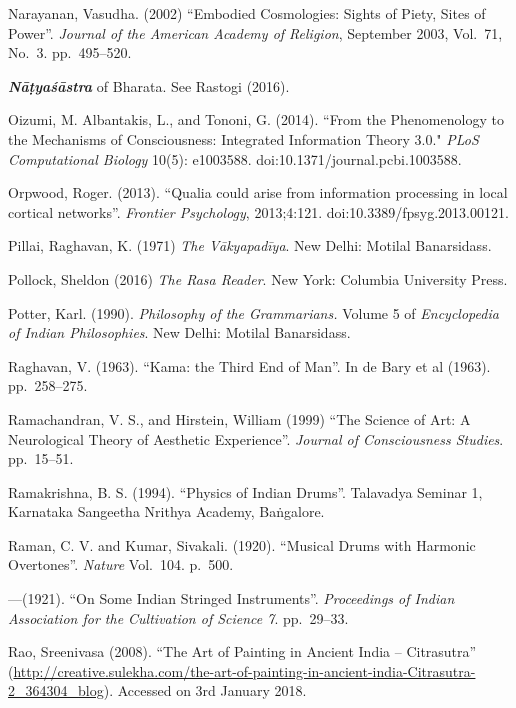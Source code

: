 \begin{thebibliography}{99}
Narayanan, Vasudha. (2002) “Embodied Cosmologies: Sights of Piety, Sites of Power”. \textsl{Journal of the American Academy of Religion}, September 2003, Vol.~71, No.~3. pp.~495--520.

{\sl\bfseries Nāṭyaśāstra} of Bharata. See Rastogi (2016).

Oizumi, M. Albantakis, L., and Tononi, G. (2014). ``From the Phenomenology to the Mechanisms of Consciousness: Integrated Information Theory 3.0." \textsl{PLoS Computational Biology} 10(5): e1003588. doi:10.1371/journal.pcbi.1003588. 

Orpwood, Roger. (2013). “Qualia could arise from information processing in local cortical networks”. \textsl{Frontier Psychology}, 2013;4:121. doi:10.3389/fpsyg.2013.00121.

Pillai, Raghavan, K. (1971) \textsl{The Vākyapadīya}. New Delhi: Motilal Banarsidass.

Pollock, Sheldon (2016) \textsl{The Rasa Reader}. New York: Columbia University Press.

Potter, Karl. (1990). \textsl{Philosophy of the Grammarians.} Volume 5 of \textsl{Encyclopedia of Indian Philosophies}. New Delhi: Motilal Banarsidass.

Raghavan, V. (1963). “Kama: the Third End of Man”. In de Bary et al (1963). pp.~258--275.

Ramachandran, V. S., and Hirstein, William (1999) “The Science of Art: A Neurological Theory of Aesthetic Experience”. \textsl{Journal of Consciousness Studies}. pp.~15--51.

Ramakrishna, B. S. (1994). “Physics of Indian Drums”. Talavadya Seminar 1, Karnataka Sangeetha Nrithya Academy, Baṅgalore.

Raman, C. V. and Kumar, Sivakali. (1920). “Musical Drums with Harmonic Overtones”. \textsl{Nature} Vol.~104. p.~500.

---\kern3pt(1921). “On Some Indian Stringed Instruments”. \textsl{Proceedings of Indian Association for the Cultivation of Science 7}. pp.~29--33.

Rao, Sreenivasa (2008). “The Art of Painting in Ancient India -- Citrasutra” (\url{http://creative.sulekha.com/the-art-of-painting-in-ancient-india-Citrasutra-2_364304_blog}). Accessed on 3rd January 2018.


\end{thebibliography}
